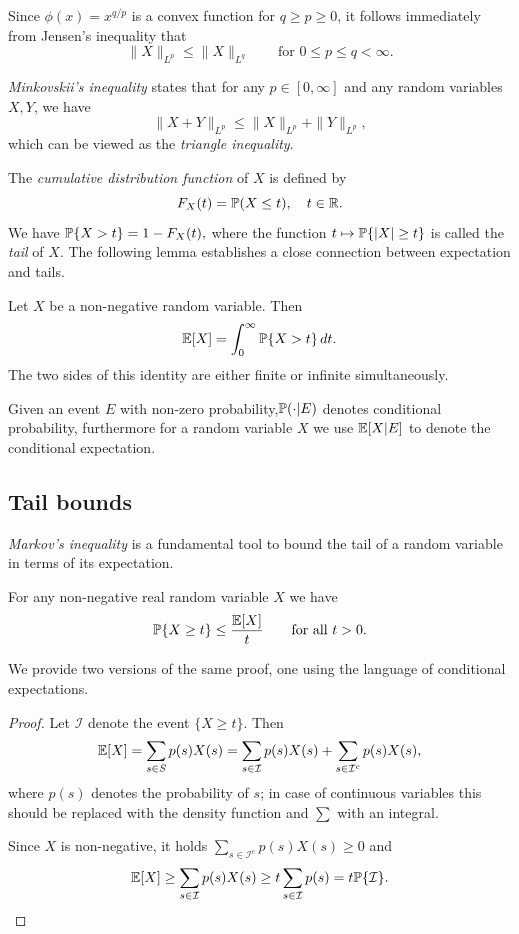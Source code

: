 Since $\phi(x) = x^{q/p}$ is a convex function for $q\geq p \geq 0$, it follows immediately from Jensen's inequality that
$$\| X\|_{L^p} \le \|X\|_{L^q} \qquad \text{for $0 \le p \le q < \infty$.}$$

{\em Minkovskii's inequality} states that for any $p \in [0,\infty]$ and any random variables $X, Y$, we have
\begin{equation}
\label{minkovski}
\|X + Y\|_{L^p} \le  \|X \|_{L^p} + \|Y\|_{L^p},
\end{equation}
which can be viewed as the {\em triangle inequality}.


\bigskip

The {\em cumulative distribution function} of $X$ is defined by
$$F_X (t) =\P(X \le t), \quad t \in \R.$$
We have $\P\{X > t\} = 1 -F_X(t),$
where the function $t \mapsto \P \{ |X| \ge t \}$ is called the {\em tail} of $X$.
The following lemma establishes a close connection between expectation and tails.
\begin{proposition}
\label{integralidentity}
Let $X$ be a non-negative random variable. Then
$$
\E[X] = \int_0^{\infty} \P \{X > t \} \, dt.$$
The two sides of this identity are either finite or infinite simultaneously.

\end{proposition}

Given an event $E$ with non-zero probability,$\P(\cdot |E)$ denotes conditional probability, furthermore for a random variable $X$ we use $\E[X|E]$ to denote the conditional expectation.

\subsection{Tail bounds}

{\em Markov's inequality} is a fundamental tool to bound the tail of a random variable in terms of its expectation.

\begin{proposition}\label{prop:markov}
For any non-negative real random variable $X$  we have
\begin{equation}
\label{markov}
\P \{ X \ge t \} \le \frac{ \E[X] }{ t } \qquad \text{for all $t  > 0$.}
\end{equation}
\end{proposition}

We provide two versions of the same proof, one using the language of conditional expectations.

\begin{proof}

Let ${\mathcal I}$ denote the event $\{X \ge t\}$. Then
$$\E[X] = \sum_{s  \in S} p(s) X(s) = \sum_{s \in {\mathcal I}} p(s) X(s) + \sum_{s \in {\mathcal I}^c} p(s) X(s),$$
where $p(s)$ denotes the probability of $s$; in case of continuous variables this should be replaced with the density function and $\sum$ with an integral.

Since $X$ is non-negative, it holds $\sum_{s \in {\mathcal I}^c} p(s) X(s) \ge 0$ and
$$\E[X] \ge \sum_{s \in {\mathcal I}} p(s) X(s) \ge t \sum_{s \in {\mathcal I}} p(s) = t \P\{{\mathcal I}\}.$$ 
\end{proof}


